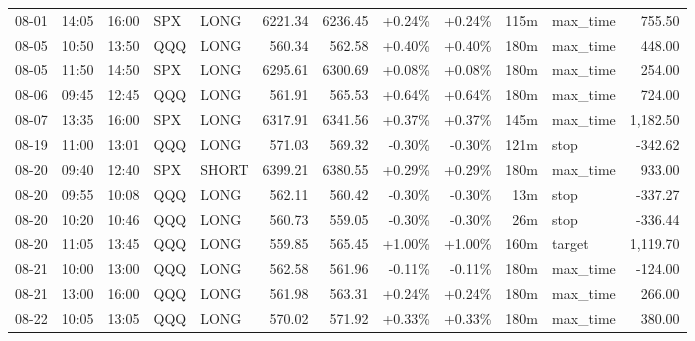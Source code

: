\documentclass[11pt,a4paper,twoside]{article}
\begin{document}
\begin{center}
\begin{longtable}{>{\color{txtmain}}l l l l l r r r r r >{\color{txtmain}}l r}
08-01 & 14:05 & 16:00 & SPX & LONG & 6221.34 & 6236.45 & \textcolor{wingreen}{+0.24\%} & \textcolor{wingreen}{+0.24\%} & 115m & max\_time & \textcolor{wingreen}{755.50} \\
08-05 & 10:50 & 13:50 & QQQ & LONG & 560.34 & 562.58 & \textcolor{wingreen}{+0.40\%} & \textcolor{wingreen}{+0.40\%} & 180m & max\_time & \textcolor{wingreen}{448.00} \\
08-05 & 11:50 & 14:50 & SPX & LONG & 6295.61 & 6300.69 & \textcolor{wingreen}{+0.08\%} & \textcolor{wingreen}{+0.08\%} & 180m & max\_time & \textcolor{wingreen}{254.00} \\
08-06 & 09:45 & 12:45 & QQQ & LONG & 561.91 & 565.53 & \textcolor{wingreen}{+0.64\%} & \textcolor{wingreen}{+0.64\%} & 180m & max\_time & \textcolor{wingreen}{724.00} \\
08-07 & 13:35 & 16:00 & SPX & LONG & 6317.91 & 6341.56 & \textcolor{wingreen}{+0.37\%} & \textcolor{wingreen}{+0.37\%} & 145m & max\_time & \textcolor{wingreen}{1,182.50} \\
08-19 & 11:00 & 13:01 & QQQ & LONG & 571.03 & 569.32 & \textcolor{lossred}{-0.30\%} & \textcolor{lossred}{-0.30\%} & 121m & stop & \textcolor{lossred}{-342.62} \\
08-20 & 09:40 & 12:40 & SPX & SHORT & 6399.21 & 6380.55 & \textcolor{wingreen}{+0.29\%} & \textcolor{wingreen}{+0.29\%} & 180m & max\_time & \textcolor{wingreen}{933.00} \\
08-20 & 09:55 & 10:08 & QQQ & LONG & 562.11 & 560.42 & \textcolor{lossred}{-0.30\%} & \textcolor{lossred}{-0.30\%} & 13m & stop & \textcolor{lossred}{-337.27} \\
08-20 & 10:20 & 10:46 & QQQ & LONG & 560.73 & 559.05 & \textcolor{lossred}{-0.30\%} & \textcolor{lossred}{-0.30\%} & 26m & stop & \textcolor{lossred}{-336.44} \\
08-20 & 11:05 & 13:45 & QQQ & LONG & 559.85 & 565.45 & \textcolor{wingreen}{+1.00\%} & \textcolor{wingreen}{+1.00\%} & 160m & target & \textcolor{wingreen}{1,119.70} \\
08-21 & 10:00 & 13:00 & QQQ & LONG & 562.58 & 561.96 & \textcolor{lossred}{-0.11\%} & \textcolor{lossred}{-0.11\%} & 180m & max\_time & \textcolor{lossred}{-124.00} \\
08-21 & 13:00 & 16:00 & QQQ & LONG & 561.98 & 563.31 & \textcolor{wingreen}{+0.24\%} & \textcolor{wingreen}{+0.24\%} & 180m & max\_time & \textcolor{wingreen}{266.00} \\
08-22 & 10:05 & 13:05 & QQQ & LONG & 570.02 & 571.92 & \textcolor{wingreen}{+0.33\%} & \textcolor{wingreen}{+0.33\%} & 180m & max\_time & \textcolor{wingreen}{380.00} \\

\end{longtable}
\end{center}
\end{document}
